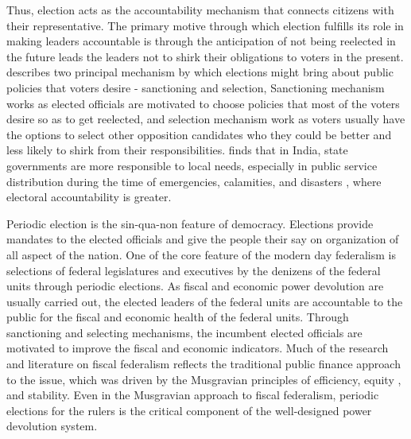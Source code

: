 Thus, election acts as the accountability mechanism that connects citizens with their representative. The primary motive through which election fulfills its role in making leaders accountable is through the anticipation of not being reelected in the future leads the leaders not to shirk their obligations to voters in the present\cite{Barro1973, Ferejohn1986, Manin1997}.  describes two principal mechanism by which elections might bring about public policies that voters desire - sanctioning and selection, Sanctioning mechanism works as elected officials are motivated to choose policies that most of the voters desire so as to get reelected, and selection mechanism work as voters usually have the options to select other opposition candidates who they could be better and less likely to shirk from their responsibilities. finds that in India, state governments are more responsible to local needs, especially in public service distribution during the time of emergencies, calamities, and disasters , where electoral accountability is greater.\par
Periodic election is the sin-qua-non feature of democracy. Elections provide mandates to the elected officials and give the people their say on organization of all aspect of the nation. One of the core feature of the modern day federalism is selections of federal legislatures and executives by the denizens of the federal units through periodic elections. As fiscal and economic power devolution are usually carried out, the elected leaders of the federal units are accountable to the public for the fiscal and economic health of the federal units. Through sanctioning and selecting mechanisms, the incumbent elected officials are motivated to improve the fiscal and economic indicators. Much of the research and literature on fiscal federalism reflects the traditional public finance approach to the issue\cite{Galligan1990}, which was driven by the Musgravian principles of efficiency, equity , and stability\cite{Musgrave1983}. Even in the Musgravian approach to fiscal federalism, periodic elections for the rulers is the critical component of the well-designed power devolution system.  \par
